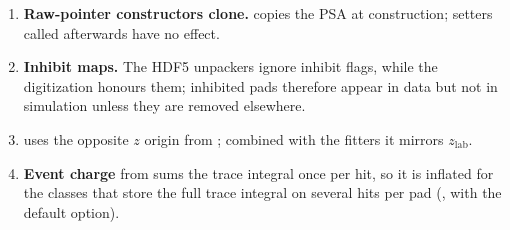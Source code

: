 \begin{enumerate}
        macro  uses ; confirm which data
        production a simulation is compared with.
  \item \textbf{Raw-pointer constructors clone.}  copies the PSA at
        construction; setters called afterwards have no effect.
  \item \textbf{Inhibit maps.} The HDF5 unpackers ignore  inhibit flags, while the
        digitization honours them; inhibited pads therefore appear in data but not in
        simulation unless they are removed elsewhere.
  \item \textbf{} uses the opposite $z$ origin from ;
        combined with the fitters it mirrors $z_\mathrm{lab}$.
  \item \textbf{Event charge} from  sums the trace integral once per hit,
        so it is inflated for the classes that store the full trace integral on several hits
        per pad (,  with the default option).
\end{enumerate}
